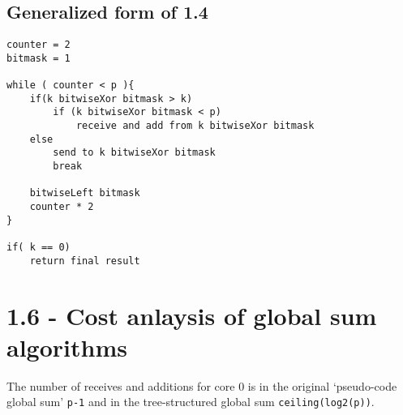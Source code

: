 \documentclass[a4paper,11pt,twoside]{article}
\begin{document}
\subsection{Generalized form of 1.4} 
\begin{verbatim}
counter = 2
bitmask = 1

while ( counter < p ){
    if(k bitwiseXor bitmask > k)
        if (k bitwiseXor bitmask < p)
            receive and add from k bitwiseXor bitmask
    else
        send to k bitwiseXor bitmask
        break

    bitwiseLeft bitmask
    counter * 2
}

if( k == 0)
    return final result
\end{verbatim}

\section{1.6 - Cost anlaysis of global sum algorithms}
The number of receives and additions for core 0 is in the original `pseudo-code global sum' \verb+p-1+ and in the tree-structured global sum \verb+ceiling(log2(p))+.


\end{document}
